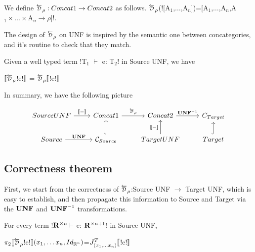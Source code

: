 \begin{definition}
    We define $\Dsynrevsymbol_{\rho}:\ConcatS\to\ConcatT$ as follows.
    $\Dsynrevsymbol_{\rho}$(![A$_1$,$\ldots$,A$_n$])=[A$_1$,$\ldots$,A$_n$,A$_1\times\ldots\times$A$_n\to \rho$]!.
\end{definition}

The design of $\Dsynrevsymbol_{\rho}$ on UNF is inspired by the semantic one between concategories, 
and it's routine to check that they match. 

\begin{proposition}
    Given a well typed term !T$_1$ $\vdash$ e: T$_2$! in Source UNF, we have
    \begin{center}
        $\seml\Dsynrevsymbol_{\rho}$!e!$\rrbracket$ = $\Dsynrevsymbol_{\rho}\seml$!e!$\rrbracket$
    \end{center}
\end{proposition}

In summary, we have the following picture

\[
\begin{tikzcd}
    SourceUNF \ar[r,"\sem{-}"] & Concat1 \ar[r,"\Dsynrevsymbol_{\rho}"] & Concat2 \ar[r,"\UNFSymbol^{-1}"] & C_{Target} \\
    Source \ar[r,"\UNFSymbol"] & \CSource \ar[u, hook] & TargetUNF \ar[u,"\sem{-}"] & Target \ar[u, hook] 
\end{tikzcd}
\]

\subsection{Correctness theorem} %
\label{sub:Correctness theorem}

First, we start from the correctness of $\Dsynrevsymbol_{\rho}$:Source UNF $\to$ Target UNF, which is easy to establish, 
and then propagate this information to Source and Target via the $\mathbf{UNF}$ and $\mathbf{UNF}^{-1}$ transformations.

\begin{proposition}
    For every term !$\mathbf{R}^{\times n} \vdash$ e: $\mathbf{R}^{\times n+1}$! in Source UNF,
    \begin{center}
        $\pi_2 \seml \Dsynrevsymbol_{\rho}$!e!$\rrbracket(x_1,\ldots x_n,Id_{\mathbb{R}^n})$=$J^T_{(x_1,\ldots x_n)}\llbracket$!e!$\rrbracket$
    \end{center} 
\end{proposition}

